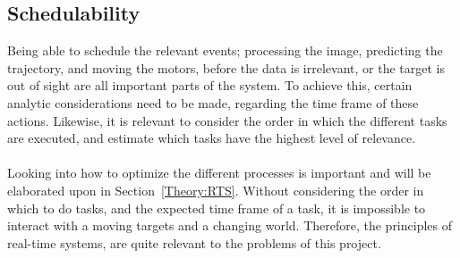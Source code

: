 \subsection{Schedulability}
Being able to schedule the relevant events; processing the image, predicting the trajectory, and moving the motors, before the data is irrelevant, or the target is out of sight are all important parts of the system.
To achieve this, certain analytic considerations need to be made, regarding the time frame of these actions. 
Likewise, it is relevant to consider the order in which the different tasks are executed, and estimate which tasks have the highest level of relevance.
\\\\
Looking into how to optimize the different processes is important and will be elaborated upon in Section~\ref{Theory:RTS}.
Without considering the order in which to do tasks, and the expected time frame of a task, it is impossible to interact with a moving targets and a changing world. 
Therefore, the principles of real-time systems, are quite relevant to the problems of this project.

